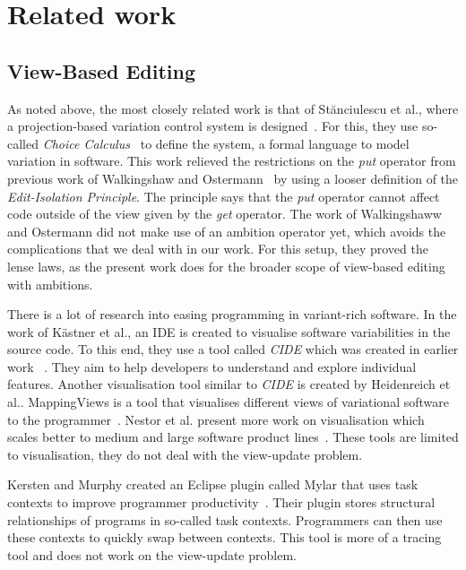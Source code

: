 \chapter{Related work}\label{sec:relatedwork}
\section{View-Based Editing}
As noted above, the most closely related work is that of St{\u{a}}nciulescu
et al., where a projection-based variation control system is designed~\cite{stuanciulescu2016}.
For this, they use so-called \emph{Choice Calculus}~\cite{walkingshaw2012} to
define the system, a formal language to model variation in software.
This work relieved the restrictions on the \emph{put} operator from previous
work of Walkingshaw and Ostermann~\cite{walkingshaw2014} by using a looser
definition of the \emph{Edit-Isolation Principle}. The principle says that 
the \emph{put} operator cannot affect code outside of the view given by the
\emph{get} operator. The work of Walkingshaww and Ostermann did not make use
of an ambition operator yet, which avoids the complications that we deal with 
in our work. For this setup, they proved the lense laws, as the present work 
does for the broader scope of view-based editing with ambitions.

There is a lot of research into easing programming in variant-rich software.
In the work of K{\"a}stner et al., an IDE is created to visualise software
variabilities in the source code. To this end, they use a tool called
\emph{CIDE} which was created in earlier work ~\cite{kastner2008, kastner2008granularity}.
They aim to help developers to understand and explore individual features.
Another visualisation tool similar to \emph{CIDE} is created by Heidenreich
et al.. MappingViews is a tool that visualises different views of variational
software to the programmer~\cite{heidenreich2008}. Nestor et al. present more
work on visualisation which scales better to medium and large software product
lines~\cite{nestor2007visualisation}. These tools are limited to visualisation,
they do not deal with the view-update problem.

Kersten and Murphy created an Eclipse plugin called Mylar that uses task
contexts to improve programmer productivity~\cite{kersten2006using}. Their
plugin stores structural relationships of programs in so-called task contexts.
Programmers can then use these contexts to quickly swap between contexts. This
tool is more of a tracing tool and does not work on the view-update problem.


